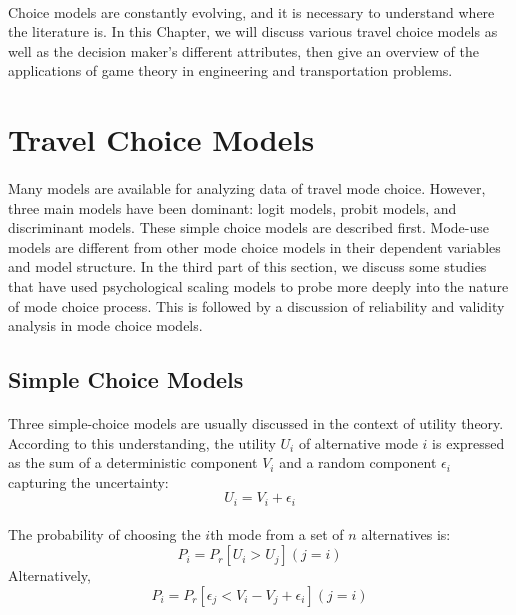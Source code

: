 
\paragraph{}Choice models are constantly evolving, and it is necessary to understand where the literature is. In this Chapter, we will discuss various travel choice models as well as the decision maker's different attributes, then give an overview of the applications of game theory in engineering and transportation problems.

\clearpage
\section{Travel Choice Models}
\paragraph{}Many models are available for analyzing data of travel mode choice. However, three main models have been dominant: logit models, probit models, and discriminant models. These simple choice models are described first. Mode-use models are different from other mode choice models in their dependent variables and model structure. In the third part of this section, we discuss some studies that have used psychological scaling models to probe more deeply into the nature of mode choice process. This is followed by a discussion of reliability and validity analysis in mode choice models.

\subsection{Simple Choice Models}
\paragraph{}Three simple-choice models are usually discussed in the context of utility theory. According to this understanding, the utility $U_i$ of alternative mode $i$ is expressed as the sum of a deterministic component $V_i$ and a random component $\epsilon_i$ capturing the uncertainty:
\begin{equation}
U_i = V_i + \epsilon_i
\end{equation}
\paragraph{} The probability of choosing the $i$th mode from a set of $n$ alternatives is: 
\begin{equation}
P_i = P_r[U_i>U_j](j=i)
\end{equation}
Alternatively, 
\begin{equation}\label{eq:3}
P_i = P_r[\epsilon_j < V_i - V_j + \epsilon_i](j=i)
\end{equation}
